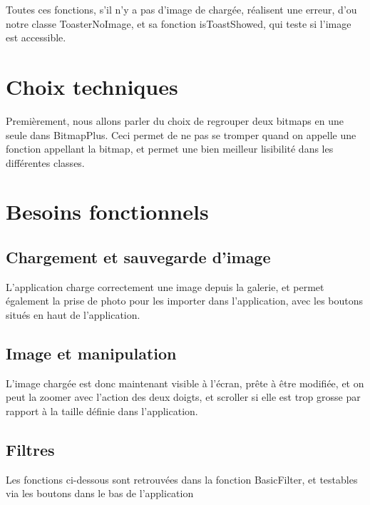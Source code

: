 \documentclass[12pt]{article}
\begin{document}
Toutes ces fonctions, s'il n'y a pas d'image de chargée, réalisent une erreur, d'ou notre classe ToasterNoImage, et sa fonction isToastShowed, qui teste si l'image est accessible.
 \\


\section{Choix techniques}

Premièrement, nous allons parler du choix de regrouper deux bitmaps en une seule dans BitmapPlus. Ceci permet de ne pas se tromper quand on appelle une fonction appellant la bitmap, et permet une bien meilleur lisibilité dans les différentes classes.



\section{Besoins fonctionnels}



\subsection{Chargement et sauvegarde d'image}

L'application charge correctement une image depuis la galerie, et permet également la prise de photo pour les importer dans l'application, avec les boutons situés en haut de l'application.



\subsection{Image et manipulation}

L'image chargée est donc maintenant visible à l'écran, prête à être modifiée, et on peut la zoomer avec l'action des deux doigts, 
et scroller si elle est trop grosse par rapport à la taille définie dans l'application.


\subsection{Filtres}

Les fonctions ci-dessous sont retrouvées dans la fonction BasicFilter, et testables via les boutons dans le bas de l'application
\end{document}
